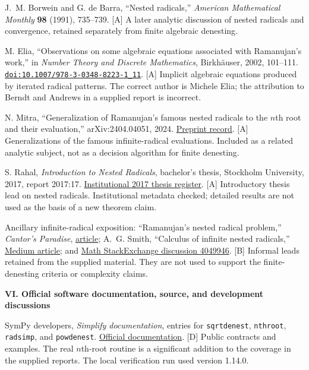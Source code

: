 \documentclass[11pt,a4paper]{article}
\numberwithin{equation}{section}
\theoremstyle{definition}\newtheorem{definition}[theorem]{Definition}
\theoremstyle{remark}\newtheorem{remark}[theorem]{Remark}
\newcommand{\doi}[1]{\href{https://doi.org/#1}{\nolinkurl{doi:#1}}}
\newcommand{\access}[2]{\href{#1}{#2}}
\newcommand{\status}[1]{\textsf{\footnotesize[#1]}}
\newcommand{\bibgroup}[1]{\par\Needspace{7\baselineskip}\bigskip\item[]\textbf{#1}\par\smallskip}
\begin{document}
\begin{thebibliography}{99}
 J.~M. Borwein and G. de Barra, ``Nested radicals,'' \emph{American Mathematical Monthly} \textbf{98} (1991), 735--739. \status{A}
A later analytic discussion of nested radicals and convergence, retained separately from finite algebraic denesting.

 M. Elia, ``Observations on some algebraic equations associated with Ramanujan's work,'' in \emph{Number Theory and Discrete Mathematics}, Birkh\"auser, 2002, 101--111. \doi{10.1007/978-3-0348-8223-1_11}. \status{A}
Implicit algebraic equations produced by iterated radical patterns. The correct author is Michele Elia; the attribution to Berndt and Andrews in a supplied report is incorrect.

 N. Mitra, ``Generalization of Ramanujan's famous nested radicals to the $n$th root and their evaluation,'' arXiv:2404.04051, 2024.
\access{https://arxiv.org/abs/2404.04051}{Preprint record}. \status{A}
Generalizations of the famous infinite-radical evaluations. Included as a related analytic subject, not as a decision algorithm for finite denesting.

 S. Rahal, \emph{Introduction to Nested Radicals}, bachelor's thesis, Stockholm University, 2017, report 2017:17.
\access{https://kurser.math.su.se/pluginfile.php/16103/mod_folder/content/0/2017/2017_examensarbeten_matematik.pdf?forcedownload=1}{Institutional 2017 thesis register}. \status{A}
Introductory thesis lead on nested radicals. Institutional metadata checked; detailed results are not used as the basis of a new theorem claim.

 Ancillary infinite-radical exposition: ``Ramanujan's nested radical problem,'' \emph{Cantor's Paradise},
\access{https://www.cantorsparadise.com/ramanujans-nested-radical-problem-f14c3060e495}{article}; A.~G. Smith, ``Calculus of infinite nested radicals,''
\access{https://medium.com/@ArchieGSmith/calculus-of-infinite-nested-radicals-1ab3e1d26774}{Medium article}; and
\access{https://math.stackexchange.com/questions/4049946/the-infinitely-nested-radicals-problem-and-ramanujans-wondrous-formula}{Math StackExchange discussion 4049946}. \status{B}
Informal leads retained from the supplied material. They are not used to support the finite-denesting criteria or complexity claims.

\bibgroup{VI. Official software documentation, source, and development discussions}

 SymPy developers, \emph{Simplify documentation}, entries for \texttt{sqrtdenest}, \texttt{nthroot}, \texttt{radsimp}, and \texttt{powdenest}.
\access{https://docs.sympy.org/latest/modules/simplify/simplify.html}{Official documentation}. \status{D}
Public contracts and examples. The real $n$th-root routine is a significant addition to the coverage in the supplied reports. The local verification run used version 1.14.0.


\end{thebibliography}
\end{document}

